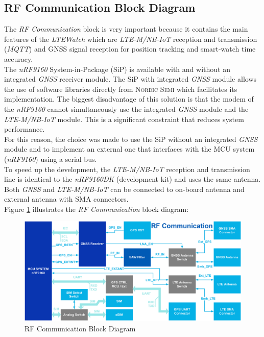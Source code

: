 \documentclass[report.tex]{subfiles}
\begin{document}
\subsection{RF Communication Block Diagram} \label{sec:rf_blk_dgr}
The \textit{RF Communication} block is very important because it contains the main  features of the \textit{LTEWatch} which are \textit{LTE-M/NB-IoT} reception and transmission (\textit{MQTT}) and {GNSS} signal reception for position tracking and smart-watch time accuracy.\\

The \textit{nRF9160} System-in-Package (SiP) is available with and without an integrated \textit{GNSS} receiver module. The SiP with integrated \textit{GNSS} module allows the use of software libraries directly from \textsc{Nordic Semi} which facilitates its implementation.
The biggest disadvantage of this solution is that the modem of the \textit{nRF9160} cannot simultaneously use the integrated \textit{GNSS} module and the \textit{LTE-M/NB-IoT} module. This is a significant constraint that reduces system performance.\\

 For this reason, the choice was made to use the SiP without an integrated \textit{GNSS} module and to implement an external one that interfaces with the MCU system (\textit{nRF9160}) using a serial bus.\\
 
To speed up the development, the \textit{LTE-M/NB-IoT} reception and transmission line is identical to the \textit{nRF9160DK} (development kit) and uses the same antenna.\\

Both \textit{GNSS} and \textit{LTE-M/NB-IoT} can be connected to on-board antenna and external antenna with SMA connectors.\\

Figure \ref{fig:rf_communication_blk} illustrates the \textit{RF Communication} block diagram:

\begin{figure}[H]
	\centering
	\includegraphics[width=1\textwidth]{Include/Figure/Hardware/rf_communication_blk.pdf}
	\caption{RF Communication Block Diagram}
	\label{fig:rf_communication_blk}
\end{figure}
\end{document}
